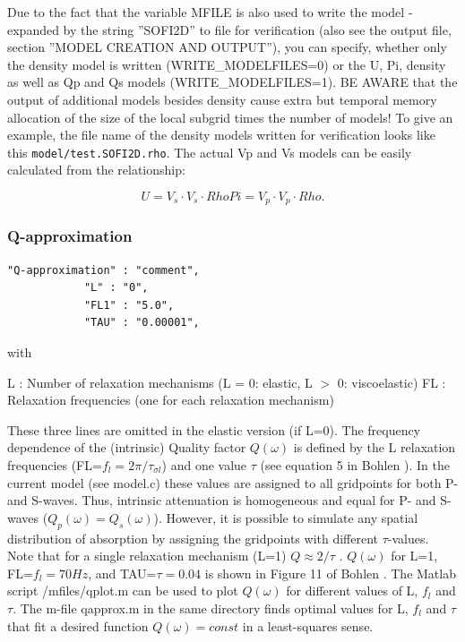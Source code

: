 \documentclass[11pt,onecolumn,oneside]{article}
\begin{document}
Due to the fact that the variable MFILE is also used to write the model - expanded by the string ''SOFI2D'' to file for verification (also see the output file, section ''MODEL CREATION AND OUTPUT''), you can specify, whether only the density model is written (WRITE\_MODELFILES=0) or the U, Pi, density as well as Qp and Qs models (WRITE\_MODELFILES=1). BE AWARE that the output of additional models besides density cause extra but temporal memory allocation of the size of the local subgrid times the number of models! To give an example, the file name of the density models written for verification looks like this \texttt{model/test.SOFI2D.rho}. The actual Vp and Vs models can be easily calculated from the relationship:

\begin{equation}
U = V_s \cdot V_s \cdot Rho
Pi = V_p \cdot V_p \cdot Rho \mbox{.}
\label{eq_U_PI}
\end{equation}


\subsubsection{Q-approximation}
\label{Q-approximation}
\begin{verbatim}
"Q-approximation" : "comment",
			"L" : "0",
			"FL1" : "5.0", 
			"TAU" : "0.00001",
\end{verbatim}

with 

L : Number of relaxation mechanisms (L = 0: elastic, L $>$ 0: viscoelastic) \newline
FL : Relaxation frequencies (one for each relaxation mechanism) \newline

These three lines are omitted in the elastic version (if L=0). The frequency dependence of the (intrinsic) Quality factor $Q(\omega)$ is defined by the L relaxation frequencies (FL=$f_l=2\pi/\tau_{\sigma l}$) and one value $\tau$ (see equation 5 in Bohlen ). In the current model (see model.c) these values are assigned to all gridpoints for both P- and S-waves. Thus, intrinsic attenuation is homogeneous and equal for P- and S-waves ($Q_p(\omega)=Q_s(\omega)$). However, it is possible to simulate any spatial distribution of absorption by assigning the gridpoints with different
$\tau$-values. Note that for a single relaxation mechanism (L=1) 
$Q \approx 2/\tau$ \cite{bohlen:02}. $Q(\omega)$ for L=1, FL=$f_l=70Hz$, and TAU=$\tau=0.04$
is shown in Figure 11 of Bohlen .
The Matlab script /mfiles/qplot.m can be used to plot $Q(\omega)$ for different values of L, $f_l$ and $\tau$. The m-file qapprox.m in the same directory finds optimal values for L, $f_l$ and $\tau$ that fit a desired function $Q(\omega)=const$ in a least-squares sense.
\end{document}
